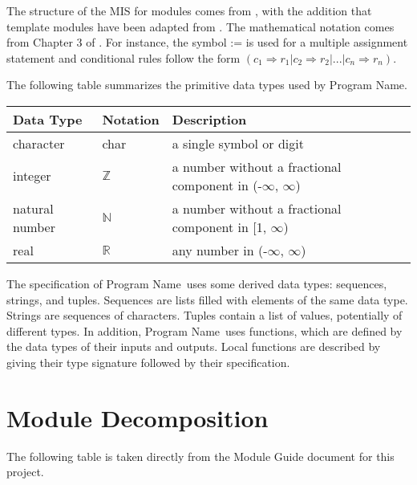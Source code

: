 \documentclass[12pt, titlepage]{article}
\newcommand{\progname}{Program Name}
\begin{document}

The structure of the MIS for modules comes from \citet{HoffmanAndStrooper1995},
with the addition that template modules have been adapted from
\cite{GhezziEtAl2003}.  The mathematical notation comes from Chapter 3 of
\citet{HoffmanAndStrooper1995}.  For instance, the symbol := is used for a
multiple assignment statement and conditional rules follow the form $(c_1
\Rightarrow r_1 | c_2 \Rightarrow r_2 | ... | c_n \Rightarrow r_n )$.

The following table summarizes the primitive data types used by \progname. 

\begin{center}
\renewcommand{\arraystretch}{1.2}
\noindent 
\begin{tabular}{l l p{7.5cm}} 
\toprule 
\textbf{Data Type} & \textbf{Notation} & \textbf{Description}\\ 
\midrule
character & char & a single symbol or digit\\
integer & $\mathbb{Z}$ & a number without a fractional component in (-$\infty$, $\infty$) \\
natural number & $\mathbb{N}$ & a number without a fractional component in [1, $\infty$) \\
real & $\mathbb{R}$ & any number in (-$\infty$, $\infty$)\\
\bottomrule
\end{tabular} 
\end{center}

\noindent
The specification of \progname \ uses some derived data types: sequences, strings, and
tuples. Sequences are lists filled with elements of the same data type. Strings
are sequences of characters. Tuples contain a list of values, potentially of
different types. In addition, \progname \ uses functions, which
are defined by the data types of their inputs and outputs. Local functions are
described by giving their type signature followed by their specification.

\section{Module Decomposition}

The following table is taken directly from the Module Guide document for this project.
\end{document}
